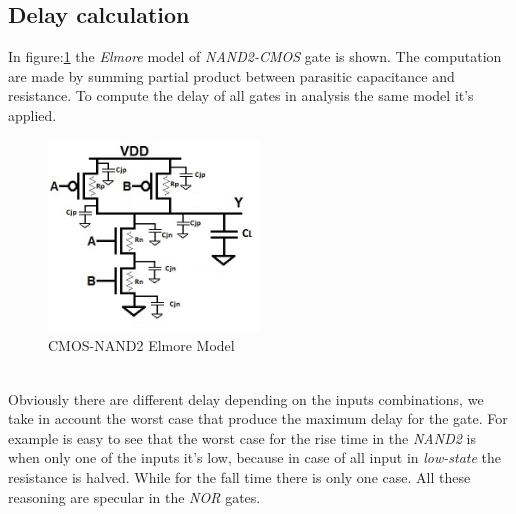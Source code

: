 \documentclass[12pt,  english, makeidx, a4paper, titlepage, oneside]{article}
\begin{document}
\subsection{Delay calculation}
In figure:\ref{fig:nand_2_cmos} the \textit{Elmore} model of \textit{NAND2-CMOS} gate is shown. The computation are made by summing partial product between parasitic capacitance and resistance. To compute the delay of all gates in analysis the same model it's applied.
\begin{figure}[htbp]
	\begin{center}
		\includegraphics[width=0.5\textwidth]{img/NAND2_StaticLogic_delay.jpg}
		\caption{CMOS-NAND2 Elmore Model}
		\label{fig:nand_2_cmos}
	\end{center}
\end{figure}\\
Obviously there are different delay depending on the inputs combinations, we take in account the worst case that produce the maximum delay for the gate.
For example is easy to see that the worst case for the rise time in the \textit{NAND2} is when only one of the inputs it's low, because in case of all input in \textit{low-state} the resistance is halved. While for the fall time there is only one case. All these reasoning are specular in the \textit{NOR} gates.
\\
\end{document}
